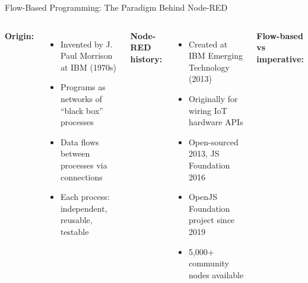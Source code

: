 \documentclass[aspectratio=169,11pt]{beamer}
\begin{document}
\begin{frame}[shrink=5]{Flow-Based Programming: The Paradigm Behind Node-RED}
    \begin{columns}
        \textbf{Origin:}
        \begin{itemize}
            \item Invented by J. Paul Morrison at IBM (1970s)
            \item Programs as networks of ``black box'' processes
            \item Data flows between processes via connections
            \item Each process: independent, reusable, testable
        \end{itemize}

        \vspace{0.15cm}
        \textbf{Node-RED history:}
        \begin{itemize}
            \item Created at IBM Emerging Technology (2013)
            \item Originally for wiring IoT hardware APIs
            \item Open-sourced 2013, JS Foundation 2016
            \item OpenJS Foundation project since 2019
            \item 5,000+ community nodes available
        \end{itemize}

        \textbf{Flow-based vs imperative:}

        \vspace{0.1cm}


\end{columns}
\end{frame}
\end{document}
